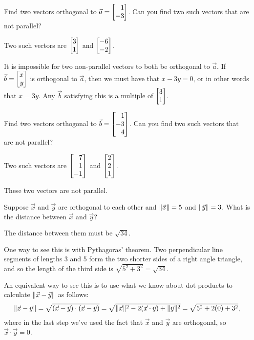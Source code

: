 \documentclass{problemset}
\begin{document}
	\begin{parts}
		\item Find two vectors orthogonal to $\vec a=\mat{1\\-3}$.  Can you find
			two such vectors that are not parallel?
			\begin{solution}
				Two such vectors are $\mat{3\\1}$ and $\mat{-6\\-2}$.

				It is impossible for two non-parallel vectors to both be
				orthogonal to $\vec a$. If $\vec b = \mat{x\\y}$ is orthogonal to
				$\vec a$, then we must have that $x - 3y = 0$, or in other words
				that $x = 3y$. Any $\vec b$ satisfying this is a multiple of
				$\mat{3\\1}$.
			\end{solution}
		\item Find two vectors orthogonal to $\vec b=\mat{1\\-3\\4}$.  Can you
			find two such vectors that are not parallel?
			\begin{solution}
				Two such vectors are $\mat{7\\1\\-1}$ and $\mat{2\\2\\1}$.

				These two vectors are not parallel.
			\end{solution}
		\item Suppose $\vec x$ and $\vec y$ are orthogonal to each other and
			$\lVert\vec x\rVert=5$ and $\lVert\vec y\rVert=3$. What is the distance between
			$\vec x$ and $\vec y$?
			\begin{solution}
				The distance between them must be $\sqrt{34}$.

				One way to see this is with Pythagoras' theorem. Two perpendicular
				line segments of lengths 3 and 5 form the two shorter sides of a
				right angle triangle, and so the length of the third side is
				$\sqrt{5^2 + 3^2} = \sqrt{34}$.

				An equivalent way to see this is to use what we know about dot
				products to calculate $\lVert\vec x-\vec y\rVert$ as follows:
				\[
					\lVert\vec x-\vec y\rVert = \sqrt{(\vec x-\vec y)\cdot(\vec x-\vec y)}
					= \sqrt{\lVert\vec x\rVert^2 - 2(\vec x\cdot\vec y) + \lVert\vec y\rVert^2}
					= \sqrt{5^2 + 2(0) + 3^2},
				\]
				where in the last step we've used the fact that $\vec x$ and $\vec y$
				are orthogonal, so $\vec x\cdot\vec y = 0$.
			\end{solution}
	\end{parts}
\end{document}
